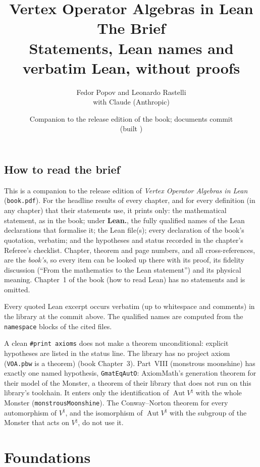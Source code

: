 \documentclass[11pt,openany]{book}
\title{\Huge Vertex Operator Algebras in Lean\\ \vspace{0.4em}\LARGE The Brief\\ \vspace{0.6em}
  \large Statements, Lean names and verbatim Lean, without proofs}
\author{Fedor Popov and Leonardo Rastelli\\ \vspace{0.3em}\small with Claude (Anthropic)}
\date{Companion to the release edition of the book; documents commit \texttt{\bookcommit}\\ \small(built \bookdate)}
\theoremstyle{definition}
\theoremstyle{plain}
\begin{document}
\frontmatter
\maketitle
\chapter*{How to read the brief}
This is a companion to the release edition of \emph{Vertex Operator Algebras in Lean}
(\texttt{book.pdf}). For the
headline results of every chapter, and for every definition (in any chapter) that their statements
use, it prints only: the mathematical statement, as in the book; under \textbf{Lean.}, the fully
qualified names of the Lean declarations that formalise it; the Lean file(s); every declaration of
the book's quotation, verbatim; and the hypotheses and status recorded in the chapter's Referee's
checklist. Chapter, theorem and page numbers, and all cross-references, are the \emph{book's}, so
every item can be looked up there with its proof, its fidelity discussion (``From the mathematics to
the Lean statement'') and its physical meaning. Chapter~1 of the book (how to read Lean) has no
statements and is omitted.

Every quoted Lean excerpt occurs verbatim (up to whitespace and comments) in the library at the
commit above. The qualified names are computed from the \texttt{namespace} blocks of the cited files.

A clean \texttt{\#print axioms} does not make a theorem unconditional: explicit hypotheses are
listed in the status line. The library has no project axiom (\texttt{VOA.pbw} is a theorem)
(book Chapter~3). Part~VIII (monstrous moonshine) has exactly one named hypothesis,
\texttt{GmatEqAutO}: AxiomMath's generation theorem for their model of the Monster, a theorem of their
library that does not run on this library's toolchain. It enters only the identification of
$\operatorname{Aut}V^\natural$ with the whole Monster (\texttt{monstrousMoonshine}). The Conway--Norton theorem for
every automorphism of $V^\natural$, and the isomorphism of $\operatorname{Aut}V^\natural$ with the subgroup of the
Monster that acts on $V^\natural$, do not use it.
\tableofcontents
\mainmatter
\pagestyle{plain}%
\part{Foundations}
\setcounter{chapter}{1}
\end{document}
